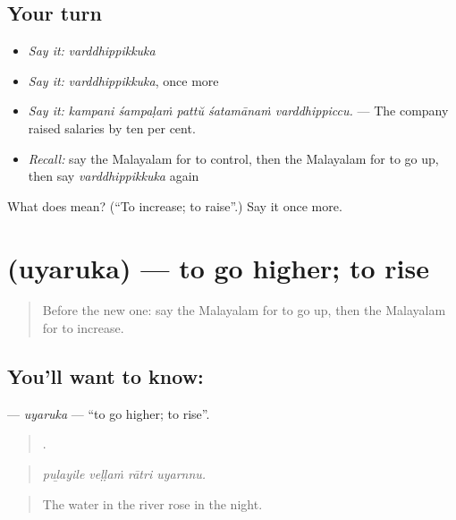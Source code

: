 \subsection*{Your turn}
\begin{itemize}
\raggedright
  \item \emph{Say it:} \emph{varddhippikkuka}
  \item \emph{Say it:} \emph{varddhippikkuka}, once more
  \item \emph{Say it:} \emph{kampani śampaḷaṁ pattŭ śatamānaṁ varddhippiccu.} — The company raised salaries by ten per cent.
  \item \emph{Recall:} say the Malayalam for to control, then the Malayalam for to go up, then say \emph{varddhippikkuka} again
\end{itemize}

\begin{tcolorbox}[breakable,colback=teal!4,colframe=teal!35!black,title={Before you move on}]
What does  mean? (\textquotedblleft{}To increase; to raise\textquotedblright{}.) Say it once more.
\end{tcolorbox}
\section[\texorpdfstring{\ml{ഉയരുക} (uyaruka)}{ഉയരുക (uyaruka)}]{ (uyaruka) — to go higher; to rise}

\label{lesson:ML-C449-uyaruka}



\begin{quote}
Before the new one: say the Malayalam for to go up, then the Malayalam for to increase.
\end{quote}

\subsection*{You'll want to know: }
\textbf{} — \emph{uyaruka} — \textquotedblleft{}to go higher; to rise\textquotedblright{}.

\begin{quote}
   .
\end{quote}

\begin{quote}
\emph{puḻayile veḷḷaṁ rātri uyarnnu.}
\end{quote}

\begin{quote}
The water in the river rose in the night.
\end{quote}

